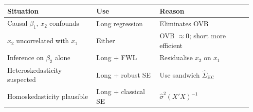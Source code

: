 \begin{remark}
	\begin{center}
		\begin{tabular}{lll}
			\hline
			\textbf{Situation} & \textbf{Use} & \textbf{Reason} \\
			\hline
			Causal $\beta_1$, $x_2$ confounds & Long regression & Eliminates OVB \\
			$x_2$ uncorrelated with $x_1$ & Either & OVB $\approx0$; short more efficient \\
			Inference on $\beta_2$ alone & Long + FWL & Residualise $x_2$ on $x_1$ \\
			Heteroskedasticity suspected & Long + robust SE & Use sandwich $\hat\Sigma_{\mathrm{HC}}$ \\
			Homoskedasticity plausible & Long + classical SE & $\hat\sigma^2(X'X)^{-1}$ \\
			\hline
		\end{tabular}
	\end{center}
\end{remark}
